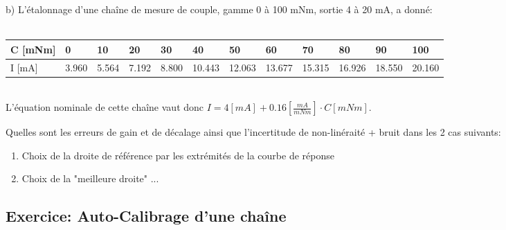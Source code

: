 b)	L'étalonnage d'une chaîne de mesure de couple, gamme 0 à 100 mNm, sortie 4 à 20 mA, a donné: \\
~
\\
\begin{tabular}{|l|l|l|l|l|l|l|l|l|l|l|l|}
    \hline
    \footnotesize C [mNm] & 0                    & 10                   & 20                   & 30                   & 40                    & 50                    & 60                    & 70                    & 80                    & 90                    & 100                   \\
    \hline

    \footnotesize I [mA]  & \footnotesize  3.960 & \footnotesize  5.564 & \footnotesize  7.192 & \footnotesize  8.800 & \footnotesize  10.443 & \footnotesize  12.063 & \footnotesize  13.677 & \footnotesize  15.315 & \footnotesize  16.926 & \footnotesize  18.550 & \footnotesize  20.160 \\
    \hline
\end{tabular}
\\

L'équation nominale de cette chaîne vaut donc $I = 4 [mA] + 0.16 [\frac{mA}{mNm}]  \cdot C [mNm]$.

Quelles sont les erreurs de gain et de décalage ainsi que l'incertitude de non-linéraité + bruit dans les 2 cas suivants:
\begin{enumerate}
    \item Choix de la droite de référence par les extrémités de la courbe de réponse
    \item Choix de la "meilleure droite"	 ...
\end{enumerate}

\subsection{Exercice: Auto-Calibrage d'une chaîne}

